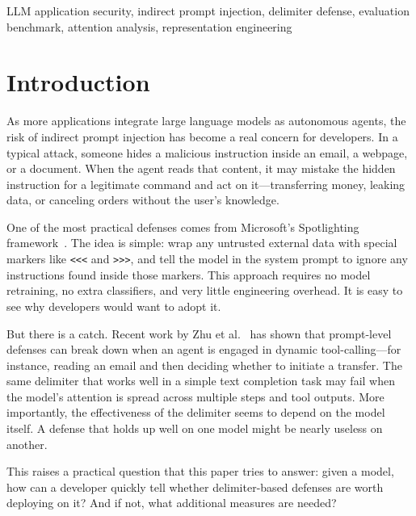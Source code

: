 \documentclass[journal]{IEEEtran}
\begin{document}
\begin{IEEEkeywords}
LLM application security, indirect prompt injection, delimiter defense, evaluation benchmark, attention analysis, representation engineering
\end{IEEEkeywords}

\IEEEpeerreviewmaketitle

\section{Introduction}

As more applications integrate large language models as autonomous agents, the risk of indirect prompt injection has become a real concern for developers. In a typical attack, someone hides a malicious instruction inside an email, a webpage, or a document. When the agent reads that content, it may mistake the hidden instruction for a legitimate command and act on it---transferring money, leaking data, or canceling orders without the user's knowledge.

One of the most practical defenses comes from Microsoft's Spotlighting framework~\cite{hines2024spotlighting}. The idea is simple: wrap any untrusted external data with special markers like \texttt{<<<} and \texttt{>>>}, and tell the model in the system prompt to ignore any instructions found inside those markers. This approach requires no model retraining, no extra classifiers, and very little engineering overhead. It is easy to see why developers would want to adopt it.

But there is a catch. Recent work by Zhu et al.~\cite{zhu2026brittle} has shown that prompt-level defenses can break down when an agent is engaged in dynamic tool-calling---for instance, reading an email and then deciding whether to initiate a transfer. The same delimiter that works well in a simple text completion task may fail when the model's attention is spread across multiple steps and tool outputs. More importantly, the effectiveness of the delimiter seems to depend on the model itself. A defense that holds up well on one model might be nearly useless on another.

This raises a practical question that this paper tries to answer: given a model, how can a developer quickly tell whether delimiter-based defenses are worth deploying on it? And if not, what additional measures are needed?
\end{document}
